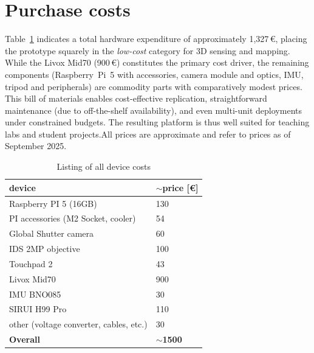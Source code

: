 \documentclass[english, bachelor, utf8]{base/thesis_telematics}
\begin{document}

\section{Purchase costs}

Table~\ref{tab:device-costs} indicates a total hardware expenditure of approximately 1{,}327\,€,
placing the prototype squarely in the \emph{low-cost} category for 3D sensing and mapping.
While the Livox Mid70 (900\,€) constitutes the primary cost driver, the remaining components
(Raspberry~Pi~5 with accessories, camera module and optics, IMU, tripod and peripherals)
are commodity parts with comparatively modest prices. This bill of materials enables
cost-effective replication, straightforward maintenance (due to off-the-shelf availability),
and even multi-unit deployments under constrained budgets. The resulting platform is thus
well suited for teaching labs and student projects.All prices are approximate and refer to prices as of September 2025.

\begin{table}[h]
\centering
\begin{tabular}{ll}
\toprule
\textbf{device} & \textbf{$\sim$price [€]} \\
\midrule
Raspberry PI 5 (16GB)   & 130 \\
PI accessories (M2 Socket, cooler)   & 54 \\
Global Shutter camera & 60 \\
IDS 2MP objective & 100 \\
Touchpad 2 & 43 \\
Livox Mid70   & 900 \\
IMU BNO085    & 30 \\
SIRUI H99 Pro & 110 \\
other (voltage converter, cables, etc.) & 30 \\
\midrule[\heavyrulewidth] %
\textbf{Overall} & \textbf{$\sim$1500} \\
\bottomrule
\end{tabular}
\caption{Listing of all device costs}
\label{tab:device-costs}
\end{table}
\end{document}
